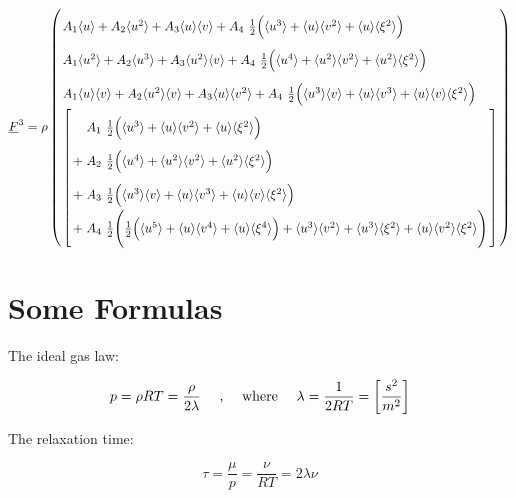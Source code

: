 \documentclass[
	pdftex,             %
	12pt,				%
	a4paper,		   	%
	english,				%
	oneside,			%
]{article}
\newcommand{\mom}[1]{\langle #1 \rangle}
\newcommand{\uu}[1]{\underline{#1}}
\begin{document}

\begin{equation}
\arraycolsep=1.4pt\def\arraystretch{2.2}
\uu{F}^3
=
\rho
\left(
\begin{array}{l}
    A_1 \mom{u} + 
    A_2 \mom{u^2} + 
    A_3 \mom{u}\mom{v}+ 
    A_4 ~\tfrac{1}{2} \Big( \mom{u^3} + \mom{u}\mom{v^2} + \mom{u}\mom{\xi^2} \Big)
\\
    A_1 \mom{u^2} + 
    A_2 \mom{u^3} + 
    A_3 \mom{u^2}\mom{v}+ 
    A_4 ~\tfrac{1}{2} \Big( \mom{u^4} + \mom{u^2}\mom{v^2} + \mom{u^2}\mom{\xi^2} \Big)
\\
    A_1 \mom{u}\mom{v} + 
    A_2 \mom{u^2}\mom{v} + 
    A_3 \mom{u}\mom{v^2}+ 
    A_4 ~\tfrac{1}{2} \Big( \mom{u^3}\mom{v} + \mom{u}\mom{v^3} + \mom{u}\mom{v}\mom{\xi^2} \Big)
\\
\left[
\begin{array}{ll}
  &	A_1 ~\tfrac{1}{2} \Big( \mom{u^3} + \mom{u}\mom{v^2} + \mom{u}\mom{\xi^2} \Big) \\
+ &	A_2 ~\tfrac{1}{2} \Big( \mom{u^4} + \mom{u^2}\mom{v^2} + \mom{u^2}\mom{\xi^2} \Big) \\
+ & A_3 ~\tfrac{1}{2} \Big( \mom{u^3}\mom{v} + \mom{u}\mom{v^3} + \mom{u}\mom{v}\mom{\xi^2} \Big) \\
+ & A_4 ~\tfrac{1}{2} \Bigg( \tfrac{1}{2} \Big( \mom{u^5} + \mom{u}\mom{v^4} + \mom{u}\mom{\xi^4} \Big)
						  + \mom{u^3}\mom{v^2} + \mom{u^3}\mom{\xi^2} + \mom{u}\mom{v^2}\mom{\xi^2} \Bigg)
\end{array}
\right]
\end{array}
\right)
\end{equation}

\clearpage
\section{Some Formulas}

The ideal gas law:

\begin{equation}
p = \rho RT = \dfrac{\rho}{2 \lambda}
\textnormal{~~~~,~~~~where~~~~}
\lambda = \frac{1}{2RT} = \left[ \dfrac{s^2}{m^2} \right]
\end{equation}

The relaxation time:

\begin{equation}
\tau = \frac{\mu}{p} = \frac{\nu}{RT} = 2\lambda\nu
\end{equation}
\end{document}
